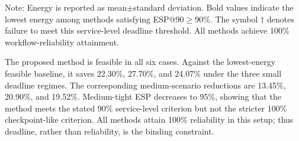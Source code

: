 \documentclass[lettersize,journal]{IEEEtran}
\begin{document}
\begin{table}[t]
\centering
\caption{Performance comparison on 20 unseen test seeds.}
\label{tab:main_results}
\renewcommand{\arraystretch}{1.08}
\setlength{\tabcolsep}{5.0pt}
\vspace{1mm}
\parbox{0.98\textwidth}{\footnotesize
Note: Energy is reported as mean$\pm$standard deviation. Bold values indicate
the lowest energy among methods satisfying ESP@90$\ge90\%$. The symbol
$\dagger$ denotes failure to meet this service-level deadline threshold. All
methods achieve 100\% workflow-reliability attainment.}
\end{table}

The proposed method is feasible in all six cases. Against the lowest-energy
feasible baseline, it saves 22.30\%, 27.70\%, and 24.07\% under the three small
deadline regimes. The corresponding medium-scenario reductions are 13.45\%,
20.90\%, and 19.52\%. Medium-tight ESP decreases to 95\%, showing that the
method meets the stated 90\% service-level criterion but not the stricter 100\%
checkpoint-like criterion. All methods attain 100\% reliability in this setup;
thus deadline, rather than reliability, is the binding constraint.
\end{document}

